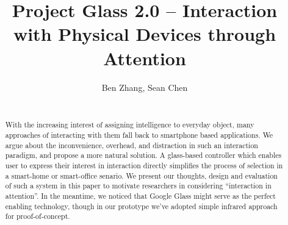 \documentclass{sig-alternate}
\begin{document}


\setlength{\paperheight}{11in}
\setlength{\paperwidth}{8.5in}
\setlength{\pdfpageheight}{\paperheight}
\setlength{\pdfpagewidth}{\paperwidth}

\title{Project Glass 2.0 -- Interaction with Physical Devices through Attention}

\author{
{Ben Zhang, Sean Chen}\\
\\
}

\maketitle

\begin{abstract}
With the increasing interest of assigning intelligence to everyday object, many approaches of interacting with them fall back to smartphone based applications. We argue about the inconvenience, overhead, and distraction in such an interaction paradigm, and propose a more natural solution. A glass-based controller which enables user to express their interest in interaction directly simplifies the process of selection in a smart-home or smart-office senario. We present our thoughts, design and evaluation of such a system in this paper to motivate researchers in considering ``interaction in attention''. In the meantime, we noticed that Google Glass might serve as the perfect enabling technology, though in our prototype we've adopted simple infrared approach for proof-of-concept.
\end{abstract}















\end{document}
